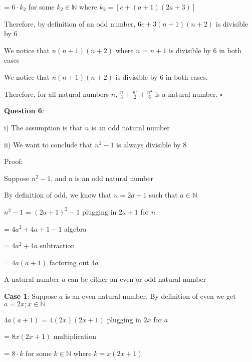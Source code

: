 \documentclass{article} %
\newcommand{\question}[2][]{\begin{flushleft}
        \textbf{Question #1}: \textit{#2}

\end{flushleft}}
\begin{document}
    \tabto*{5.24cm} = $6 \cdot k_{2}$ for some $k_{2} \in \mathbb{N}$ where $k_{2} = [c + (a+1)(2a+3)]$


    \tabto*{2cm} Therefore, by definition of an odd number, $6c + 3(n+1)(n+2)$ is divisible by 6

    \tabto*{1cm}We notice that $n(n + 1)(n + 2)$ where $n$ = $n + 1$ is divisible by 6 in both cases

    We notice that $n(n + 1)(n + 2)$ is divisible by 6 in both cases.

    Therefore, for all natural numbers $n$, $\frac{n}{3} + \frac{n^2}{2} + \frac{n^3}{6}$ is a natural number. $\square$

    \question[6]{}

    i) The assumption is that $n$ is an odd natural number

    ii) We want to conclude that $n^2 -1$ is always divisible by 8

    Proof:

    Suppose $n^2-1$, and n is an odd natural number
    
    By definition of odd, we know that $n = 2a+1$ such that $a \in \mathbb{N}$

    $n^2-1$ = $(2a+1)^2-1$ \tabto*{5cm}plugging in $2a + 1$ for $n$

    \tabto*{1.64cm} = $4a^2 + 4a + 1 -1$ \tabto*{5cm}algebra

    \tabto*{1.64cm} = $4a^2 + 4a$ \tabto*{5cm}subtraction

    \tabto*{1.64cm} = $4a(a + 1)$ \tabto*{5cm}factoring out 4$a$

    A natural number $a$ can be either an even or odd natural number 

    \vspace*{0.2cm}

    \textbf{Case 1}: Suppose $a$ is an even natural number. By definition of even we get $a = 2x; x \in \mathbb{N}$

    $4a(a + 1)$ = $4(2x)(2x + 1)$ \tabto*{5cm}plugging in $2x$ for $a$

    \tabto*{2.08cm} = $8x(2x + 1)$ \tabto*{5cm}multiplication

    \tabto*{2.08cm} = $8\cdot k$ for some $k \in \mathbb{N}$ where $k = x(2x + 1)$

\end{document}

